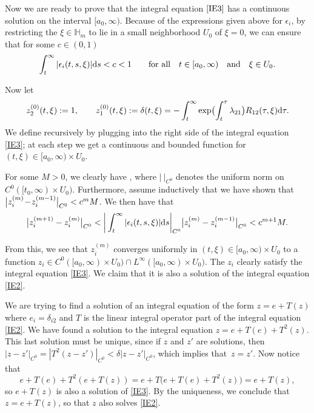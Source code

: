 Now we are ready to prove that the integral equation $\eqref{IE3}$ has a continuous solution on the interval $[a_0,\infty)$. Because of the expressions given above for $\epsilon_i$, by restricting the $\xi \in \mathbb{H}_m$ to lie in a small neighborhood $U_{0}$ of $\xi=0$, we can ensure that for some $c\in (0,1)$
\begin{equation*}
 \int_{t}^{\infty}|\epsilon_i(t,s,\xi)|{\rm d}s<c<1 \qquad \text{for all} \quad t\in [a_0,\infty) \quad \text{and} \quad \xi \in U_{0}.
\end{equation*}

Now let
\[
z^{(0)}_2(t,\xi):=1 , \qquad z^{(0)}_1(t,\xi):=\delta(t,\xi)= -\int_{t}^{\infty}\exp \bigl(\int_{t}^{\tau}\lambda_{21}\bigr)R_{12}(\tau,\xi){\rm d}\tau.
\]
 We define  recursively by plugging  into the right side of the integral equation \eqref{IE3}; at each step we get a continuous and bounded function for $(t,\xi) \in [a_0,\infty)\times U_{0}$.

For some $M>0$, we clearly have , where $|\ |_{C^0}$ denotes the uniform norm on~${C^0([t_0,\infty)\times U_{0})}$. Furthermore, assume inductively that we have shown that $\smash{\big|z^{(m)}_i \!-\! z^{(m-1)}_i\big|_{C^0}}\allowbreak<c^m M$. We then have that
\begin{equation*}
 \big|z^{(m+1)}_i - z^{(m)}_i\big|_{C^0}< \bigg|\int_{t}^{\infty}|\epsilon_i(t,s,\xi)|{\rm d}s\bigg|_{C^0}\big|z^{(m)}_i - z^{(m-1)}_i\big|_{C^0}<c^{m+1}M.
\end{equation*}

From this, we see that $z_i^{(m)}$ converges uniformly in $(t,\xi)\in [a_0,\infty)\times U_{0}$ to a function $z_i \in C^0([a_0,\infty)\times U_{0})\cap L^{\infty}([a_0,\infty)\times U_{0})$. The $z_i$ clearly satisfy the integral equation \eqref{IE3}. We claim that it is also a solution of the integral equation \eqref{IE2}.

We are trying to find a solution of an integral equation of the form
$
 z= e + T(z)
$
where $e_i=\delta_{i2}$ and $T$ is the linear integral operator part of the integral equation \eqref{IE2}. We have found a solution to the integral equation $z=e+T(e)+T^2(z)$. This last solution must be unique, since if $z$ and $z'$ are solutions, then $|z-z'|_{C^0}=|T^2(z-z')|_{C^0}<\delta |z-z'|_{C^0}$, which implies that~${z=z'}$. Now notice that
\begin{equation*}
 e+T(e)+T^2(e+T(z))=e+T\bigl(e+T(e)+T^2(z)\bigr)=e+T(z),
\end{equation*}
so $e+T(z)$ is also a solution of \eqref{IE3}. By the uniqueness, we conclude that $z=e+T(z)$, so that $z$ also solves \eqref{IE2}.

